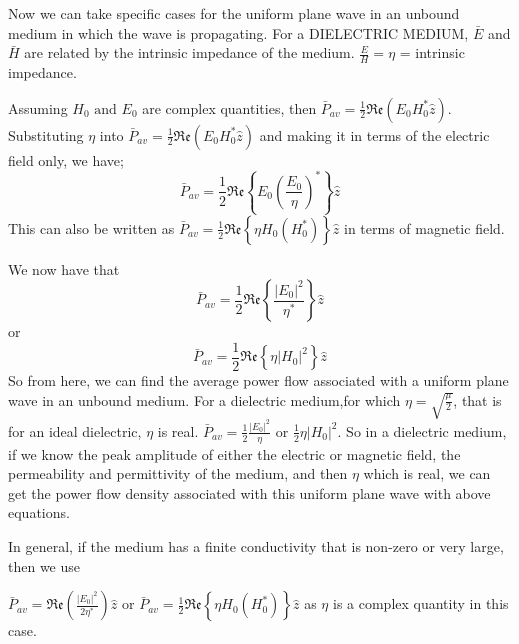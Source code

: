 Now we can take specific cases for the uniform plane wave in an unbound medium in which the wave is propagating. For a DIELECTRIC MEDIUM, $ \bar{E} $ and $ \bar{H} $ are related by the intrinsic impedance of the medium.
$ \frac{E}{H}=\eta $ = intrinsic impedance.

Assuming $H_{0} \text{ and } E_{0}$ are complex quantities, then $\bar{P}_{av}=\frac{1}{2} \mathfrak{Re}(E_0H_0^{*}\hat{z}) $. Substituting $\eta$ into $ \bar{P}_{av}=\frac{1}{2} \mathfrak{Re}(E_0H_0^{*}\hat{z}) $ and making it in terms of the electric field only,  we have;
\begin{dmath*}
\bar{P}_{av}=\frac{1}{2} \mathfrak{Re}\left\{E_0(\frac{E_0}{\eta})^{*}\right\}\hat{z}  
\end{dmath*}
This can also be written as $ \bar{P}_{av}= \frac{1}{2}\mathfrak{Re}\left\{\eta H_0(H_0^{*})\right\}\hat{z} $ in terms of magnetic field.

We now have that 
\begin{dmath*}
\bar{P}_{av}=\frac{1}{2}\mathfrak{Re}\left\{\frac{|E_0|^{2}}{\eta^{*}}\right\}\hat{z}
\end{dmath*}
or 
\begin{dmath}
\bar{P}_{av}=\frac{1}{2}\mathfrak{Re}\left\{\eta|H_0|^{2}\right\}\hat{z}
\end{dmath}
So from here, we can find the average power flow associated with a uniform plane wave in an unbound medium. For a dielectric medium,for which $ \eta=\sqrt{\frac{\mu}{2}} $, that is for an ideal dielectric, $ \eta $ is real.
$ \bar{P}_{av}=\frac{1}{2}\frac{|E_0|^{2}}{\eta} $ or $ \frac{1}{2}\eta|H_0|^{2} $. So in a dielectric medium, if we know the peak amplitude of either the electric or magnetic field, the permeability and permittivity of the medium, and then $ \eta $ which is real, we can get the power flow density associated with this uniform plane wave with above equations.

In general, if the medium has a finite conductivity that is non-zero or very large, then we use

$ \bar{P}_{av}=\mathfrak{Re}(\frac{|E_0|^{2}}{2\eta^{*}})\hat{z} $ or  $ \bar{P}_{av}= \frac{1}{2}\mathfrak{Re}\left\{\eta H_0(H_0^{*})\right\}\hat{z} $ 
as $ \eta $ is a complex quantity in this case.

